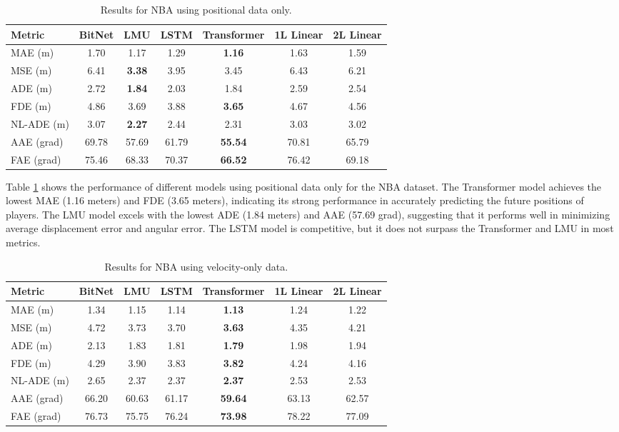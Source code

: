 \begin{table}[H]
\centering
\caption{Results for NBA using positional data only.}
\label{pos:NBA1}
\begin{tabular}{l||c|c|c|c|c|c}
Metric & BitNet & LMU & LSTM & Transformer & 1L Linear & 2L Linear \\
\hline \hline
MAE (m) & 1.70 & 1.17 & 1.29 & \textbf{1.16} & 1.63 & 1.59 \\
MSE (m) & 6.41 & \textbf{3.38} & 3.95 & 3.45 & 6.43 & 6.21 \\
ADE (m) & 2.72 & \textbf{1.84} & 2.03 & 1.84 & 2.59 & 2.54 \\
FDE (m) & 4.86 & 3.69 & 3.88 & \textbf{3.65} & 4.67 & 4.56 \\
NL-ADE (m) & 3.07 & \textbf{2.27} & 2.44 & 2.31 & 3.03 & 3.02 \\
AAE (grad) & 69.78 & 57.69 & 61.79 & \textbf{55.54} & 70.81 & 65.79 \\
FAE (grad) & 75.46 & 68.33 & 70.37 & \textbf{66.52} & 76.42 & 69.18 \\
\end{tabular}
\end{table}

Table \ref{pos:NBA1} shows the performance of different models using positional data only for the NBA dataset. The Transformer model achieves the lowest MAE (1.16 meters) and FDE (3.65 meters), indicating its strong performance in accurately predicting the future positions of players. The LMU model excels with the lowest ADE (1.84 meters) and AAE (57.69 grad), suggesting that it performs well in minimizing average displacement error and angular error. The LSTM model is competitive, but it does not surpass the Transformer and LMU in most metrics.

\begin{table}[H]
\centering
\caption{Results for NBA using velocity-only data.}
\label{vel:NBA1}
\begin{tabular}{l||c|c|c|c|c|c}
Metric & BitNet & LMU & LSTM & Transformer & 1L Linear & 2L Linear \\
\hline \hline
MAE (m) & 1.34 & 1.15 & 1.14 & \textbf{1.13} & 1.24 & 1.22 \\
MSE (m) & 4.72 & 3.73 & 3.70 & \textbf{3.63} & 4.35 & 4.21 \\
ADE (m) & 2.13 & 1.83 & 1.81 & \textbf{1.79} & 1.98 & 1.94 \\
FDE (m) & 4.29 & 3.90 & 3.83 & \textbf{3.82} & 4.24 & 4.16 \\
NL-ADE (m) & 2.65 & 2.37 & 2.37 & \textbf{2.37} & 2.53 & 2.53 \\
AAE (grad) & 66.20 & 60.63 & 61.17 & \textbf{59.64} & 63.13 & 62.57 \\
FAE (grad) & 76.73 & 75.75 & 76.24 & \textbf{73.98} & 78.22 & 77.09 \\
\end{tabular}
\end{table}

